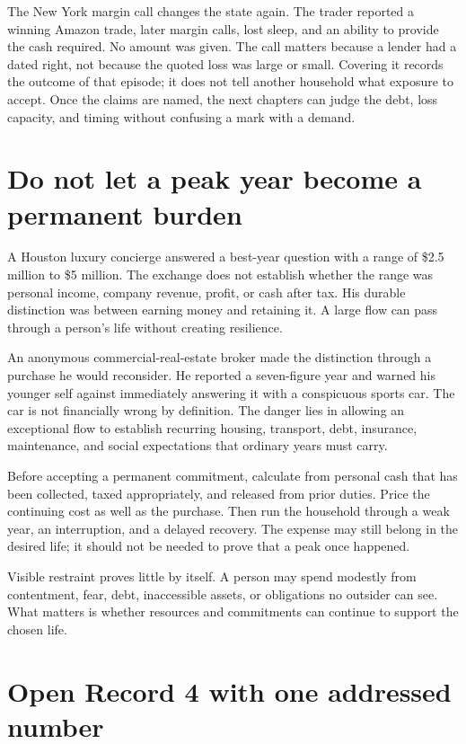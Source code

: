 The New York margin call changes the state again. The trader reported a winning
Amazon trade, later margin calls, lost sleep, and an ability to provide the cash
required. No amount was given. The call matters because a lender had a dated
right, not because the quoted loss was large or small. Covering it records the
outcome of that episode; it does not tell another household what exposure to
accept. Once the claims are named, the next chapters can judge the debt, loss
capacity, and timing without confusing a mark with a demand.

\section{Do not let a peak year become a permanent burden}

A Houston luxury concierge answered a best-year question with a range of
\$2.5 million to \$5 million. The exchange does not establish whether the range
was personal income, company revenue, profit, or cash after tax. His durable
distinction was between earning money and retaining it. A large flow can pass
through a person's life without creating resilience.

An anonymous commercial-real-estate broker made the distinction through a
purchase he would reconsider. He reported a seven-figure year and warned his
younger self against immediately answering it with a conspicuous sports car.
The car is not financially wrong by definition. The danger lies in allowing an
exceptional flow to establish recurring housing, transport, debt, insurance,
maintenance, and social expectations that ordinary years must carry.

Before accepting a permanent commitment, calculate from personal cash that has
been collected, taxed appropriately, and released from prior duties. Price the
continuing cost as well as the purchase. Then run the household through a weak
year, an interruption, and a delayed recovery. The expense may still belong in
the desired life; it should not be needed to prove that a peak once happened.

Visible restraint proves little by itself. A person may spend modestly from
contentment, fear, debt, inaccessible assets, or obligations no outsider can
see. What matters is whether resources and commitments can continue to support
the chosen life.

\clearpage

\section{Open Record 4 with one addressed number}

